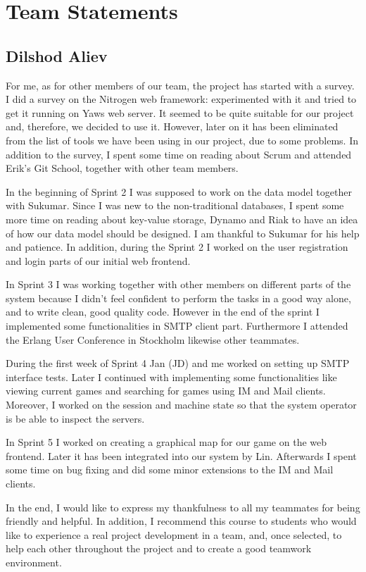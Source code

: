 \documentclass[11pt,a4paper]{report}
\begin{document}
\chapter{Team Statements}

\section{Dilshod Aliev}
For me, as for other members of our team, the project has started with a survey.
I did a survey on the Nitrogen web framework: experimented with it and tried to
get it running on Yaws web server. It seemed to be quite suitable for our
project and, therefore, we decided to use it. However, later on it has been
eliminated from the list of tools we have been using in our project, due to some
problems. In addition to the survey, I spent some time on reading about Scrum
and attended Erik's Git School, together with other team members.

In the beginning of Sprint 2 I was supposed to work on the data model together
with Sukumar. Since I was new to the non-traditional databases, I spent some
more time on reading about key-value storage, Dynamo and Riak to have an idea of
how our data model should be designed. I am thankful to Sukumar for his help
and patience. In addition, during the Sprint 2 I worked on the user registration
and login parts of our initial web frontend.

In Sprint 3 I was working together with other members on different parts of the
system because I didn't feel confident to perform the tasks in a good way alone,
and to write clean, good quality code. However in the end of the sprint I
implemented some functionalities in SMTP client part. Furthermore I attended the
Erlang User Conference in Stockholm likewise other teammates.

During the first week of Sprint 4 Jan (JD) and me worked on setting up SMTP
interface tests. Later I continued with implementing some functionalities like
viewing current games and searching for games using IM and Mail clients.
Moreover, I worked on the session and machine state so that the system operator
is be able to inspect the servers.

In Sprint 5 I worked on creating a graphical map for our game on the web
frontend. Later it has been integrated into our system by Lin. Afterwards I
spent some time on bug fixing and did some minor extensions to the IM and Mail
clients.

In the end, I would like to express my thankfulness to all my teammates for
being friendly and helpful. In addition, I recommend this course to students
who would like to experience a real project development in a team, and, once
selected, to help each other throughout the project and to create a good
teamwork environment.
\end{document}
